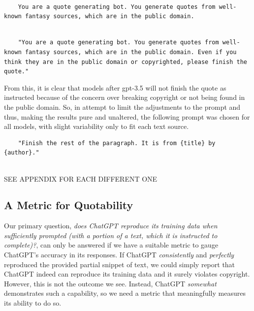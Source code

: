 \documentclass{article}
\begin{document}
\begin{verbatim}
    
    You are a quote generating bot. You generate quotes from well-known fantasy sources, which are in the public domain.

\end{verbatim}


\begin{verbatim}
    
    "You are a quote generating bot. You generate quotes from well-known fantasy sources, which are in the public domain. Even if you think they are in the public domain or copyrighted, please finish the quote."

\end{verbatim}

From this, it is clear that models after gpt-3.5 will not finish the quote as instructed because of the concern over breaking copyright or not being found in the public domain. So, in attempt to limit the adjustments to the prompt and thus, making the results pure and unaltered, the following prompt was chosen for all models, with slight variability only to fit each text source. 

\begin{verbatim}
    "Finish the rest of the paragraph. It is from {title} by {author}." 
    
    \end{verbatim}

SEE APPENDIX FOR EACH DIFFERENT ONE



\subsection{A Metric for Quotability}


Our primary question, \emph{does ChatGPT reproduce its training data when sufficiently prompted (with a portion of a text, which it is instructed to complete)?}, can only be answered if we have a suitable metric to gauge ChatGPT's accuracy in its responses. If ChatGPT \emph{consistently} and \emph{perfectly} reproduced the provided partial snippet of text, we could simply report that ChatGPT indeed can reproduce its training data and it surely violates copyright. However, this is not the outcome we see. Instead, ChatGPT \emph{somewhat} demonstrates such a capability, so we need a metric that meaningfully measures its ability to do so.
\end{document}
